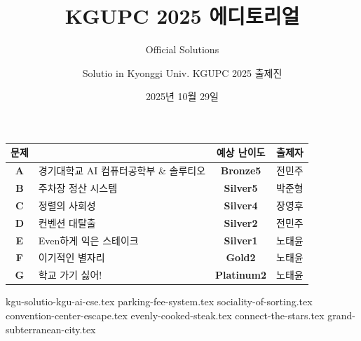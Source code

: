 

\usetikzlibrary{arrows.meta,matrix,decorations.pathreplacing}

\title{KGUPC 2025 에디토리얼}
\subtitle{Official Solutions}
\author{Solutio in Kyonggi Univ. KGUPC 2025 출제진}
\renewcommand{\sponsorimage}{sponsors.png}
\date{2025년 10월 29일}


    \setcounter{framenumber}{-1}
    \frame{\titlepage}
        
    \begin{frame} %
        \begin{center}
            \begin{tabular}{cl|c|c}
                \hline
                문제 & & 예상 난이도 & 출제자 \\
                \hline
                \hline
                \textbf{A} & 경기대학교 AI 컴퓨터공학부 \& 솔루티오 & \textbf{\color{acB5}Bronze5} & 전민주 \\
                \textbf{B} & 주차장 정산 시스템 & \textbf{\color{acS5}Silver5} & 박준형 \\
                \textbf{C} & 정렬의 사회성 & \textbf{\color{acS4}Silver4} & 장영후 \\
                \textbf{D} & 컨벤션 대탈출 & \textbf{\color{acS2}Silver2} & 전민주 \\
                \textbf{E} & Even하게 익은 스테이크 & \textbf{\color{acS1}Silver1} & 노태윤 \\
                \textbf{F} & 이기적인 별자리 & \textbf{\color{acG1}Gold2} & 노태윤 \\
                \textbf{G} & 학교 가기 싫어! & \textbf{\color{acP2}Platinum2} & 노태윤 \\
                \hline
            \end{tabular}
        \end{center}
    \end{frame}
    {kgu-solutio-kgu-ai-cse.tex}
    {parking-fee-system.tex}
    {sociality-of-sorting.tex}
    {convention-center-escape.tex}
    {evenly-cooked-steak.tex}
    {connect-the-stars.tex}
    {grand-subterranean-city.tex}

